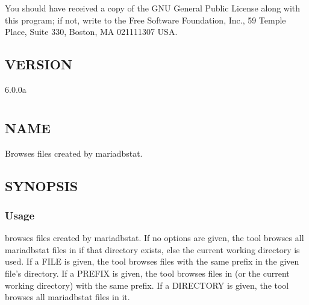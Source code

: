 \documentclass[letterpaper,10pt,english]{sphinxmanual}
\begin{document}
You should have received a copy of the GNU General Public License along with
this program; if not, write to the Free Software Foundation, Inc., 59 Temple
Place, Suite 330, Boston, MA  02111\sphinxhyphen{}1307  USA.


\section{VERSION}
\label{\detokenize{mariadb-stat:version}}
 6.0.0a


\chapter{}
\label{\detokenize{mariadb-stat-browser:mariadb-stat-browser}}\label{\detokenize{mariadb-stat-browser::doc}}

\section{NAME}
\label{\detokenize{mariadb-stat-browser:name}}
 \sphinxhyphen{} Browses files created by mariadb\sphinxhyphen{}stat.


\section{SYNOPSIS}
\label{\detokenize{mariadb-stat-browser:synopsis}}

\subsection{Usage}
\label{\detokenize{mariadb-stat-browser:usage}}
\begin{sphinxVerbatim}[commandchars=\\\{\}]
 
\end{sphinxVerbatim}

 browses files created by mariadb\sphinxhyphen{}stat.  If no options are given,
the tool browses all mariadb\sphinxhyphen{}stat files in  if that directory
exists, else the current working directory is used.  If a FILE is given,
the tool browses files with the same prefix in the given file’s directory.
If a PREFIX is given, the tool browses files in 
(or the current working directory) with the same prefix.  If a DIRECTORY
is given, the tool browses all mariadb\sphinxhyphen{}stat files in it.
\end{document}
